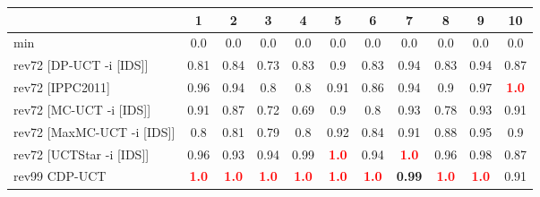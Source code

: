 \documentclass{article}
\begin{document}
\begin{tabular}{|l|r@{$\pm$}rr@{$\pm$}rr@{$\pm$}rr@{$\pm$}rr@{$\pm$}rr@{$\pm$}rr@{$\pm$}rr@{$\pm$}rr@{$\pm$}rr@{$\pm$}r|}
\hline

& \multicolumn{2}{c}{1}
& \multicolumn{2}{c}{2}
& \multicolumn{2}{c}{3}
& \multicolumn{2}{c}{4}
& \multicolumn{2}{c}{5}
& \multicolumn{2}{c}{6}
& \multicolumn{2}{c}{7}
& \multicolumn{2}{c}{8}
& \multicolumn{2}{c}{9}
& \multicolumn{2}{c|}{10}
\\
\hline
\hline
min
& \multicolumn{2}{c}{0.0}
& \multicolumn{2}{c}{0.0}
& \multicolumn{2}{c}{0.0}
& \multicolumn{2}{c}{0.0}
& \multicolumn{2}{c}{0.0}
& \multicolumn{2}{c}{0.0}
& \multicolumn{2}{c}{0.0}
& \multicolumn{2}{c}{0.0}
& \multicolumn{2}{c}{0.0}
& \multicolumn{2}{c|}{0.0}
\\
rev72 [DP-UCT -i [IDS]]
& \multicolumn{2}{c}{0.81}
& \multicolumn{2}{c}{0.84}
& \multicolumn{2}{c}{0.73}
& \multicolumn{2}{c}{0.83}
& \multicolumn{2}{c}{0.9}
& \multicolumn{2}{c}{0.83}
& \multicolumn{2}{c}{0.94}
& \multicolumn{2}{c}{0.83}
& \multicolumn{2}{c}{0.94}
& \multicolumn{2}{c|}{0.87}
\\
rev72 [IPPC2011]
& \multicolumn{2}{c}{0.96}
& \multicolumn{2}{c}{0.94}
& \multicolumn{2}{c}{0.8}
& \multicolumn{2}{c}{0.8}
& \multicolumn{2}{c}{0.91}
& \multicolumn{2}{c}{0.86}
& \multicolumn{2}{c}{0.94}
& \multicolumn{2}{c}{0.9}
& \multicolumn{2}{c}{0.97}
& \multicolumn{2}{c|}{\textbf{\textcolor{red}{1.0}}}
\\
rev72 [MC-UCT -i [IDS]]
& \multicolumn{2}{c}{0.91}
& \multicolumn{2}{c}{0.87}
& \multicolumn{2}{c}{0.72}
& \multicolumn{2}{c}{0.69}
& \multicolumn{2}{c}{0.9}
& \multicolumn{2}{c}{0.8}
& \multicolumn{2}{c}{0.93}
& \multicolumn{2}{c}{0.78}
& \multicolumn{2}{c}{0.93}
& \multicolumn{2}{c|}{0.91}
\\
rev72 [MaxMC-UCT -i [IDS]]
& \multicolumn{2}{c}{0.8}
& \multicolumn{2}{c}{0.81}
& \multicolumn{2}{c}{0.79}
& \multicolumn{2}{c}{0.8}
& \multicolumn{2}{c}{0.92}
& \multicolumn{2}{c}{0.84}
& \multicolumn{2}{c}{0.91}
& \multicolumn{2}{c}{0.88}
& \multicolumn{2}{c}{0.95}
& \multicolumn{2}{c|}{0.9}
\\
rev72 [UCTStar -i [IDS]]
& \multicolumn{2}{c}{0.96}
& \multicolumn{2}{c}{0.93}
& \multicolumn{2}{c}{0.94}
& \multicolumn{2}{c}{0.99}
& \multicolumn{2}{c}{\textbf{\textcolor{red}{1.0}}}
& \multicolumn{2}{c}{0.94}
& \multicolumn{2}{c}{\textbf{\textcolor{red}{1.0}}}
& \multicolumn{2}{c}{0.96}
& \multicolumn{2}{c}{0.98}
& \multicolumn{2}{c|}{0.87}
\\
\hline
rev99 CDP-UCT
& \multicolumn{2}{c}{\textbf{\textcolor{red}{1.0}}}
& \multicolumn{2}{c}{\textbf{\textcolor{red}{1.0}}}
& \multicolumn{2}{c}{\textbf{\textcolor{red}{1.0}}}
& \multicolumn{2}{c}{\textbf{\textcolor{red}{1.0}}}
& \multicolumn{2}{c}{\textbf{\textcolor{red}{1.0}}}
& \multicolumn{2}{c}{\textbf{\textcolor{red}{1.0}}}
& \multicolumn{2}{c}{\textbf{0.99}}
& \multicolumn{2}{c}{\textbf{\textcolor{red}{1.0}}}
& \multicolumn{2}{c}{\textbf{\textcolor{red}{1.0}}}
& \multicolumn{2}{c|}{0.91}
\\
\hline
\end{tabular}%
\end{document}
